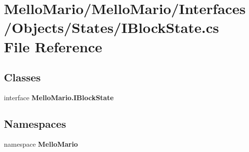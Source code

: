 \section{Mello\+Mario/\+Mello\+Mario/\+Interfaces/\+Objects/\+States/\+I\+Block\+State.cs File Reference}
\label{IBlockState_8cs}
\subsection*{Classes}
\begin{DoxyCompactItemize}
\item 
interface \textbf{ Mello\+Mario.\+I\+Block\+State}
\end{DoxyCompactItemize}
\subsection*{Namespaces}
\begin{DoxyCompactItemize}
\item 
namespace \textbf{ Mello\+Mario}
\end{DoxyCompactItemize}
